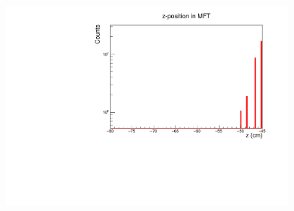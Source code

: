\documentclass[10pt]{beamer}
\begin{document}
\begin{frame}
\begin{columns}
\begin{column}{0.5\textwidth}
\begin{figure}
                \begin{center}
                    \includegraphics[width=0.95\textwidth]{Plots/pass4_MFT/Z_MFT_pass4.pdf}
                \end{center}
            \end{figure}
        \end{column}
    \end{columns}

\end{frame}
\end{document}

